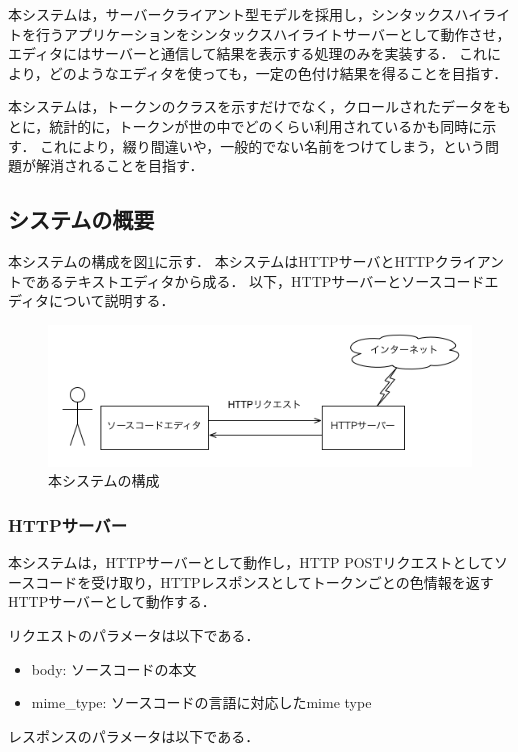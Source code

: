 \documentclass{cs-thesis}
\begin{document}
 本システムは，サーバークライアント型モデルを採用し，シンタックスハイライトを行うアプリケーションをシンタックスハイライトサーバーとして動作させ，エディタにはサーバーと通信して結果を表示する処理のみを実装する．
 これにより，どのようなエディタを使っても，一定の色付け結果を得ることを目指す．

 本システムは，トークンのクラスを示すだけでなく，クロールされたデータをもとに，統計的に，トークンが世の中でどのくらい利用されているかも同時に示す．
 これにより，綴り間違いや，一般的でない名前をつけてしまう，という問題が解消されることを目指す．

  \subsection{システムの概要}
  本システムの構成を図\ref{system}に示す．
  本システムはHTTPサーバとHTTPクライアントであるテキストエディタから成る．
  以下，HTTPサーバーとソースコードエディタについて説明する．

    \begin{figure}[htbp]
   \centering
   \includegraphics[scale=0.8]{system.png}
   \caption{本システムの構成}
   \label{system}
  \end{figure}

  \subsubsection{HTTPサーバー}
    本システムは，HTTPサーバーとして動作し，HTTP POSTリクエストとしてソースコードを受け取り，HTTPレスポンスとしてトークンごとの色情報を返すHTTPサーバーとして動作する．

  リクエストのパラメータは以下である．

  \begin{itemize}
   \item body: ソースコードの本文
   \item mime\_type: ソースコードの言語に対応したmime type
  \end{itemize}

  レスポンスのパラメータは以下である．
\end{document}
